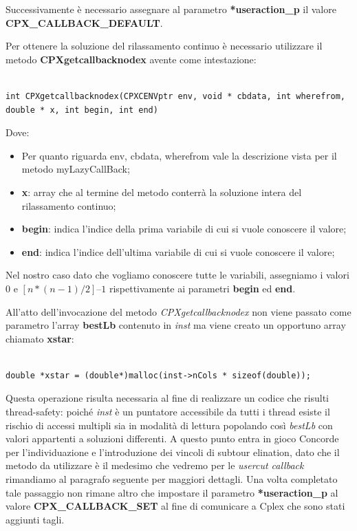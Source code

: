 \documentclass[11pt]{article}
\begin{document}
Successivamente è necessario assegnare al parametro \textbf{*useraction\_p} il valore \textbf{CPX\_CALLBACK\_DEFAULT}.

Per ottenere la soluzione del rilassamento continuo è necessario utilizzare il metodo \textbf{CPXgetcallbacknodex} avente come intestazione:

\begin{lstlisting}

int CPXgetcallbacknodex(CPXCENVptr env, void * cbdata, int wherefrom, double * x, int begin, int end) 

\end{lstlisting}

Dove:

\begin{itemize}
    \item Per quanto riguarda env, cbdata, wherefrom vale la descrizione vista per il metodo myLazyCallBack;
    \item \textbf{x}: array che al termine del metodo conterrà la soluzione intera del rilassamento continuo;
    \item \textbf{begin}: indica l’indice della prima variabile di cui si vuole conoscere il valore;
    \item \textbf{end}: indica l’indice dell’ultima variabile di cui si vuole conoscere il valore;
\end{itemize}

Nel nostro caso dato che vogliamo conoscere tutte le variabili, assegniamo i valori \textbf{$0$} e \textbf{$[n*(n-1)/2] – 1$} rispettivamente ai parametri \textbf{begin} ed \textbf{end}.

All'atto dell'invocazione del metodo \textit{CPXgetcallbacknodex} non viene passato come parametro l'array \textbf{bestLb} contenuto in \textit{inst} ma viene creato un opportuno array chiamato \textbf{xstar}:

\begin{lstlisting}

double *xstar = (double*)malloc(inst->nCols * sizeof(double));

\end{lstlisting}

Questa operazione risulta necessaria al fine di realizzare un codice che risulti thread-safety: poiché \textit{inst} è un puntatore accessibile da tutti i thread esiste il rischio di accessi multipli sia in modalità di lettura popolando così \textit{bestLb} con valori appartenti a soluzioni differenti.
A questo punto entra in gioco Concorde per l'individuazione e l'introduzione dei vincoli di subtour elination, dato che il metodo da utilizzare è il medesimo che vedremo per le \textit{usercut callback} rimandiamo al paragrafo seguente per maggiori dettagli.
Una volta completato tale passaggio non rimane altro che impostare il parametro \textbf{*useraction\_p} al valore \textbf{CPX\_CALLBACK\_SET} al fine di comunicare a Cplex che sono stati aggiunti tagli.
\end{document}
